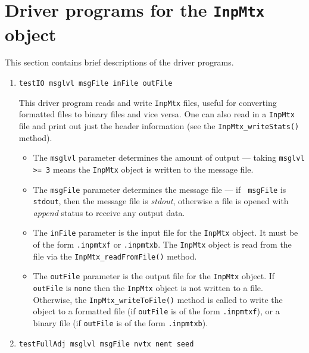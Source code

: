 \par
\section{Driver programs for the {\tt InpMtx} object}
\label{section:InpMtx:drivers}
\par
This section contains brief descriptions of the driver programs.
\par
\begin{enumerate}
\item
\begin{verbatim}
testIO msglvl msgFile inFile outFile
\end{verbatim}
This driver program reads and write {\tt InpMtx} files, useful for
converting formatted files to binary files and vice versa.
One can also read in a {\tt InpMtx} file and print out just the 
header information (see the {\tt InpMtx\_writeStats()} method).
\par
\begin{itemize}
\item
The {\tt msglvl} parameter determines the amount of output ---
taking {\tt msglvl >= 3} means the {\tt InpMtx} object is written
to the message file.
\item
The {\tt msgFile} parameter determines the message file --- if {\tt
msgFile} is {\tt stdout}, then the message file is {\it stdout},
otherwise a file is opened with {\it append} status to receive any
output data.
\item
The {\tt inFile} parameter is the input file for the {\tt InpMtx}
object. It must be of the form {\tt *.inpmtxf} or {\tt *.inpmtxb}.
The {\tt InpMtx} object is read from the file via the
{\tt InpMtx\_readFromFile()} method.
\item
The {\tt outFile} parameter is the output file for the {\tt InpMtx}
object. 
If {\tt outFile} is {\tt none} then the {\tt InpMtx} object is not
written to a file. 
Otherwise, the {\tt InpMtx\_writeToFile()} method is called to write
the object to 
a formatted file (if {\tt outFile} is of the form {\tt *.inpmtxf}),
or
a binary file (if {\tt outFile} is of the form {\tt *.inpmtxb}).
\end{itemize}
\item
\begin{verbatim}
testFullAdj msglvl msgFile nvtx nent seed

\end{verbatim}
\end{enumerate}
